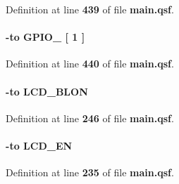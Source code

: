 Definition at line {\bf 439} of file {\bf main.\+qsf}.

\paragraph[{P\+I\+N\+\_\+\+K26}]{ {\bfseries \textcolor{vhdlchar}{-\/}\textcolor{keywordflow}{to}\textcolor{vhdlchar}{ }\textcolor{vhdlchar}{G\+P\+I\+O\+\_}\textcolor{vhdlchar}{ }\textcolor{vhdlchar}{[}\textcolor{vhdlchar}{ } \textcolor{vhdldigit}{1} \textcolor{vhdlchar}{ }\textcolor{vhdlchar}{]}\textcolor{vhdlchar}{ }}\hspace{0.3cm}{\ttfamily [Constraints]}}\label{main_8qsf_af56b849fbe04a8ae6a002ec2187ee58c}


Definition at line {\bf 440} of file {\bf main.\+qsf}.

\paragraph[{P\+I\+N\+\_\+\+K2}]{ {\bfseries \textcolor{vhdlchar}{-\/}\textcolor{keywordflow}{to}\textcolor{vhdlchar}{ }\textcolor{vhdlchar}{L\+C\+D\+\_\+\+B\+L\+ON}\textcolor{vhdlchar}{ }}\hspace{0.3cm}{\ttfamily [Constraints]}}\label{main_8qsf_acc7ae20dea39dfdc689ce70f5d30f12f}


Definition at line {\bf 246} of file {\bf main.\+qsf}.

\paragraph[{P\+I\+N\+\_\+\+K3}]{ {\bfseries \textcolor{vhdlchar}{-\/}\textcolor{keywordflow}{to}\textcolor{vhdlchar}{ }\textcolor{vhdlchar}{L\+C\+D\+\_\+\+EN}\textcolor{vhdlchar}{ }}\hspace{0.3cm}{\ttfamily [Constraints]}}\label{main_8qsf_a39f977bbeccdc39ef36b954e3c5c2b35}


Definition at line {\bf 235} of file {\bf main.\+qsf}.

